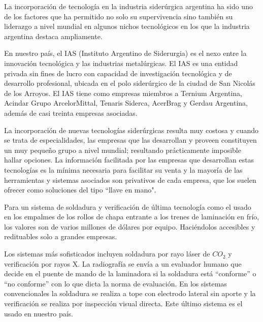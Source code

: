 La incorporación de tecnología en la industria siderúrgica argentina ha sido uno de los factores que ha permitido no solo su supervivencia sino también su liderazgo a nivel mundial en algunos nichos tecnológicos en los que la industria argentina destaca ampliamente. 



En nuestro país, el IAS (Instituto Argentino de Siderurgia) es el nexo entre la innovación tecnológica y las industrias metalúrgicas. El IAS es una entidad privada sin fines de lucro con capacidad de investigación tecnológica y de desarrollo profesional, ubicada en el polo siderúrgico de la ciudad de San Nicolás de los Arroyos. El IAS tiene como empresas miembros a Ternium Argentina, Acindar Grupo ArcelorMittal, Tenaris Siderca, AcerBrag y Gerdau Argentina, además de casi treinta empresas asociadas.


La incorporación de nuevas tecnologías siderúrgicas resulta muy costosa y cuando se trata de especialidades, las empresas que las desarrollan y proveen constituyen un muy pequeño grupo a nivel mundial; resultando prácticamente imposible hallar opciones. La información facilitada por las empresas que desarrollan estas tecnologías es la mínima necesaria para facilitar su venta y la mayoría de las herramientas y sistemas asociados son privativos de cada empresa, que los suelen ofrecer como soluciones del tipo ``llave en mano".


Para un sistema de soldadura y verificación de última tecnología como el usado en los empalmes de los rollos de chapa entrante a los trenes de laminación en frío, los valores son de varios millones de dólares por equipo. Haciéndolos accesibles y redituables solo a grandes empresas. 


Los sistemas más sofisticados incluyen soldadura por rayo láser de $CO_{2}$ y verificación por rayos X. La radiografía se envía a un evaluador humano que decide en el puente de mando de la laminadora si la soldadura está ``conforme'' o ``no conforme'' con lo que dicta la norma de evaluación. En los sistemas convencionales la soldadura se realiza a tope con electrodo lateral sin aporte y la verificación se realiza por inspección visual directa. Este último sistema es el usado en nuestro país. 

